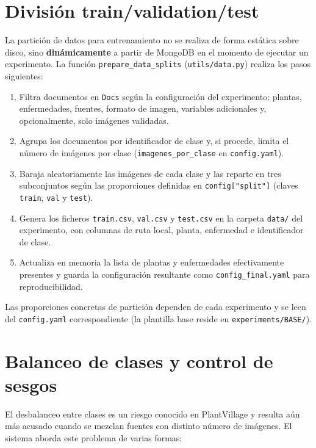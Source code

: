 \documentclass[11pt,spanish,listoffigures,listoftables]{tfgetsinf}
\begin{document}
\section{División train/validation/test}

La partición de datos para entrenamiento no se realiza de forma estática sobre disco, sino \textbf{dinámicamente} a partir de MongoDB en el momento de ejecutar un experimento. La función \texttt{prepare\_data\_splits} (\texttt{utils/data.py}) realiza los pasos siguientes:

\begin{enumerate}
    \item Filtra documentos en \texttt{Docs} según la configuración del experimento: plantas, enfermedades, fuentes, formato de imagen, variables adicionales y, opcionalmente, solo imágenes validadas.
    \item Agrupa los documentos por identificador de clase y, si procede, limita el número de imágenes por clase (\texttt{imagenes\_por\_clase} en \texttt{config.yaml}).
    \item Baraja aleatoriamente las imágenes de cada clase y las reparte en tres subconjuntos según las proporciones definidas en \texttt{config["split"]} (claves \texttt{train}, \texttt{val} y \texttt{test}).
    \item Genera los ficheros \texttt{train.csv}, \texttt{val.csv} y \texttt{test.csv} en la carpeta \texttt{data/} del experimento, con columnas de ruta local, planta, enfermedad e identificador de clase.
    \item Actualiza en memoria la lista de plantas y enfermedades efectivamente presentes y guarda la configuración resultante como \texttt{config\_final.yaml} para reproducibilidad.
\end{enumerate}

Las proporciones concretas de partición dependen de cada experimento y se leen del \texttt{config.yaml} correspondiente (la plantilla base reside en \texttt{experiments/BASE/}).

\section{Balanceo de clases y control de sesgos}

El desbalanceo entre clases es un riesgo conocido en PlantVillage y resulta aún más acusado cuando se mezclan fuentes con distinto número de imágenes. El sistema aborda este problema de varias formas:
\end{document}
